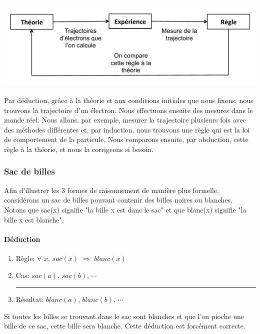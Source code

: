 \begin{center}
\includegraphics[scale=0.50]{images/BoucleRaisonnement2.pdf}
\end{center}

Par déduction, grâce à la théorie et aux conditions initiales que nous fixons, nous trouvons la trajectoire d'un électron. Nous effectuons ensuite des mesures dans le monde réel. Nous allons, par exemple, mesurer la trajectoire plusieurs fois avec des méthodes différentes et, par induction, nous trouvons une règle qui est la loi de comportement de la particule. Nous comparons ensuite, par abduction, cette règle à la théorie, et nous la corrigeons si besoin.\\



\subsubsection{Sac de billes}

Afin d'illustrer les 3 formes de raisonnement de manière plus formelle, considérons un sac de billes pouvant contenir des billes noires ou blanches. Notons que sac(x) signifie "la bille x est dans le sac" et que blanc(x) signifie "la bille x est blanche". \\

\paragraph{Déduction}

\begin{enumerate}
  \item Règle: $\forall$ $x$, $sac(x)$ $\Rightarrow$ $blanc(x)$
  \item Cas: $sac(a)$, $sac(b)$, $\cdots$\\
  \rule{5.5cm}{.1pt} 
  \item Résultat: $blanc(a)$, $blanc(b)$, $\cdots$
\end{enumerate}

Si toutes les billes se trouvant dans le sac sont blanches et que l'on pioche une bille de ce sac, cette bille sera blanche. Cette déduction est forcément correcte.

